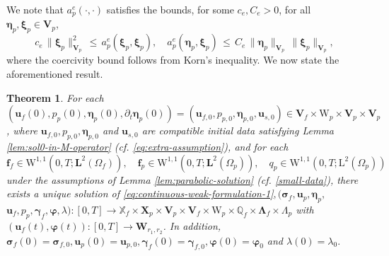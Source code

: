 \documentclass[11pt]{article}
\numberwithin{equation}{section}
\newcommand{\bgamma}{{\boldsymbol\gamma}}
\newcommand{\bLambda}{{\boldsymbol\Lambda}}
\newcommand{\bbeta}{{\boldsymbol\eta}}
\newcommand{\bsi}{{\boldsymbol\sigma}}
\newcommand{\bvarphi}{{\boldsymbol\varphi}}
\newcommand{\bxi}{{\boldsymbol\xi}}
\newcommand{\f}{\mathbf{f}}
\newcommand{\bu}{\mathbf{u}}
\newcommand{\0}{{\mathbf{0}}}
\def\bX{\mathbf{X}}
\def\bV{\mathbf{V}}
\def\bW{\mathbf{W}}
\newcommand{\bL}{\mathbf{L}}
\newcommand\bbQ{\mathbb{Q}}
\newcommand\bbX{\mathbb{X}}
\def\L{\mathrm{L}}
\def\W{\mathrm{W}}
\newtheorem{thm}{Theorem}[section]
\numberwithin{equation}{section}
\begin{document}
We note that $a^e_p(\cdot,\cdot)$ satisfies the bounds, for some $c_e, C_e > 0$, for all $\bbeta_p, \bxi_p\in \bV_p$,
\begin{equation}\label{eq:aep-coercivity-bound}
c_e\,\|\bxi_p\|^2_{\bV_p} \,\leq\, a^e_p(\bxi_p, \bxi_p),\quad
a^e_p(\bbeta_p, \bxi_p) \,\leq\, C_e\,\|\bbeta_p\|_{\bV_p}\,\|\bxi_p\|_{\bV_p},
\end{equation}
where the coercivity bound follows from Korn's inequality.
We now state the aforementioned result.
%
\begin{thm}\label{thm:unique soln}
For each $(\bu_f(0), p_p(0), \bbeta_p(0), \partial_t\bbeta_p(0)) = (\bu_{f,0}, p_{p,0}, \bbeta_{p,0}, \bu_{s,0})\in \bV_f\times \W_p\times \bV_p\times \bV_p$, where $\bu_{f,0}, p_{p,0}, \bbeta_{p,0}$ and $\bu_{s,0}$ are compatible initial data satisfying Lemma \ref{lem:sol0-in-M-operator} (cf. \eqref{eq:extra-assumption}), and for each
\begin{equation*}
\f_f\in \W^{1,1}(0,T;\bL^2(\Omega_f)),\quad \f_p\in \W^{1,1}(0,T;\bL^2(\Omega_p)),\quad q_p\in \W^{1,1}(0,T;\L^2(\Omega_p))
\end{equation*}
under the assumptions of Lemma \ref{lem:parabolic-solution} (cf. \eqref{small-data}), there exists a unique solution of \eqref{eq:continuous-weak-formulation-1}$, (\bsi_f,\bu_p, \bbeta_p,$
$\bu_f, p_p, \bgamma_f, \bvarphi, \lambda): [0,T]\to \bbX_f\times \bX_p\times\bV_p\times\bV_f\times \W_p\times \bbQ_f\times \bLambda_f\times \Lambda_p$ with $(\bu_f(t),\bvarphi(t)):[0,T]\to \bW_{r_1,r_2}$. In addition, $\bsi_f(0) = \bsi_{f,0}, \bu_p(0) = \bu_{p,0},  \bgamma_f(0) = \bgamma_{f,0}, \bvarphi(0) = \bvarphi_{0}$ and $\lambda(0) = \lambda_{0}.$
\end{thm}
%
\end{document}
